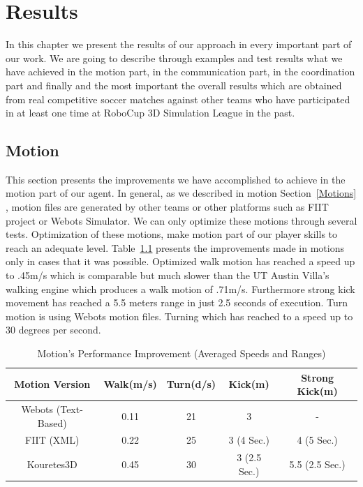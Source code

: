 \chapter{Results}
\label{results}
In this chapter we present the results of our approach in every important part of our work. We are going to describe through examples and test results what we have achieved in the motion part, in the communication part, in the coordination part and finally and the most important the overall results which are obtained from real competitive soccer matches against other teams who have participated in at least one time at RoboCup 3D Simulation League in the past.


\section{Motion}
This section presents the improvements we have accomplished to achieve in the motion part of our agent. In general, as we described in motion Section~\ref{Motions} , motion files are generated by other teams or other platforms such as FIIT project or Webots Simulator. We can only optimize these motions through several tests. Optimization of these motions, make motion part of our player skills to reach an adequate level. Table~\ref{MotionImprovements} presents the improvements made in motions only in cases that it was possible. Optimized walk motion has reached a speed up to .45m/s which is comparable but much slower than the UT Austin Villa's walking engine which produces a walk motion of .71m/s. Furthermore strong kick movement has reached a 5.5 meters range in just 2.5 seconds of execution. Turn motion is using Webots motion files. Turning which has reached to a speed up to 30 degrees per second. 

\begin{table}[t!]
\caption{Motion's Performance Improvement (Averaged Speeds and Ranges)}
\label{MotionImprovements}
\begin{center}
\begin{small}
\begin{tabular}{ccccc}
\textbf{Motion Version} & \textbf{Walk(m/s)}	& \textbf{Turn(d/s)}	& \textbf{Kick(m)}&\textbf{Strong Kick(m)} \\
\midrule
Webots (Text-Based) 		& 0.11 				& 21 				& 3 				& - \\
FIIT (XML)				& 0.22 				& 25 				& 3 (4 Sec.) 		& 4 (5 Sec.) \\
Kouretes3D 		& 0.45 	& 30 		& 3 (2.5 Sec.)& 5.5 (2.5 Sec.) \\
\end{tabular}
\end{small}
\end{center}
\end{table}




